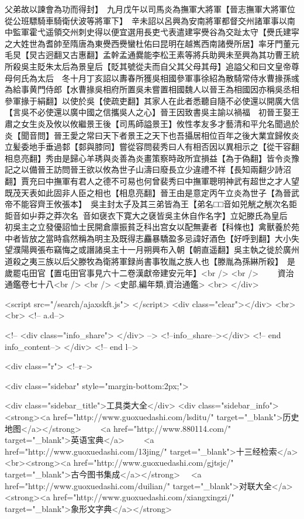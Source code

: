 父弟故以諫會為功而得封】　九月戊午以司馬炎為撫軍大將軍【晉志撫軍大將軍位從公班驃騎車騎衛伏波等將軍下】　辛未詔以呂興為安南將軍都督交州諸軍事以南中監軍霍弋遥領交州刺史得以便宜選用長吏弋表遣建寜㸑谷為交趾太守【㸑氏建寜之大姓世為耆帥至隋唐為東㸑西㸑蠻杜佑曰昆明在越嶲西南諸㸑所居】率牙門董元毛炅【炅古迥翻又古惠翻】孟幹孟通爨能李松王素等將兵助興未至興為其功曹王統所殺吳主貶朱太后為景皇后【貶其號從夫而自父其父母其母】追謚父和曰文皇帝尊母何氏為太后　冬十月丁亥詔以夀春所獲吳相國參軍事徐紹為散騎常侍水曹掾孫彧為給事黄門侍郎【水曹掾吳相府所置吳未嘗置相國魏人以晉王為相國因亦稱吳丞相參軍掾于絹翻】以使於吳【使疏吏翻】其家人在此者悉聽自隨不必使還以開廣大信【言吳不必使還以廣中國之信攜吳人之心】晉王因致書吳主諭以禍福　初晉王娶王肅之女生炎及攸以攸繼景王後【司馬師謚景王】攸性孝友多才藝清和平允名聞過於炎【聞音問】晉王愛之常曰天下者景王之天下也吾攝居相位百年之後大業宜歸攸炎立髪委地手垂過䣛【䣛與膝同】嘗從容問裴秀曰人有相否因以異相示之【從干容翻相息亮翻】秀由是歸心羊琇與炎善為炎畫策察時政所宜損益【為于偽翻】皆令炎豫記之以備晉王訪問晉王欲以攸為世子山濤曰廢長立少違禮不祥【長知兩翻少詩沼翻】賈充曰中撫軍有君人之德不可易也何曾裴秀曰中撫軍聰明神武有超世之才人望既茂天表如此固非人臣之相也【相息亮翻】晉王由是意定丙午立炎為世子【為晉武帝不能容齊王攸張本】　吳主封太子及其三弟皆為王【弟名□□音如兕觥之觥次名壾壾音如屮莽之莽次名音如襃衣下寛大之褎皆吳主休自作名字】立妃滕氏為皇后　初吳主之立發優詔恤士民開倉廪振貧乏科出宫女以配無妻者【科條也】禽獸養於苑中者皆放之當時翕然稱為明主及既得志麤暴驕盈多忌諱好酒色【好呼到翻】大小失望濮陽興張布竊悔之或譖諸吳主十一月朔興布入朝【朝直遥翻】吳主執之徙於廣州道殺之夷三族以后父滕牧為衛將軍録尚書事牧胤之族人也【滕胤為孫綝所殺】　是歲罷屯田官【置屯田官事見六十二卷漢獻帝建安元年】<br />
<br />
　　資治通鑑卷七十八<br />
<br />
<史部,編年類,資治通鑑>  <br>
   </div> 

<script src="/search/ajaxskft.js"> </script>
 <div class="clear"></div>
<br>
<br>
 <!-- a.d-->

 <!--
<div class="info_share">
</div> 
-->
 <!--info_share--></div>   <!-- end info_content-->
  </div> <!-- end l-->

<div class="r">   <!--r-->



<div class="sidebar"  style="margin-bottom:2px;">

 
<div class="sidebar_title">工具类大全</div>
<div class="sidebar_info">
<strong><a href="http://www.guoxuedashi.com/lsditu/" target="_blank">历史地图</a></strong>　　
<a href="http://www.880114.com/" target="_blank">英语宝典</a>　　
<a href="http://www.guoxuedashi.com/13jing/" target="_blank">十三经检索</a>　
<br><strong><a href="http://www.guoxuedashi.com/gjtsjc/" target="_blank">古今图书集成</a></strong>　
<a href="http://www.guoxuedashi.com/duilian/" target="_blank">对联大全</a>　<strong><a href="http://www.guoxuedashi.com/xiangxingzi/" target="_blank">象形文字典</a></strong>　

